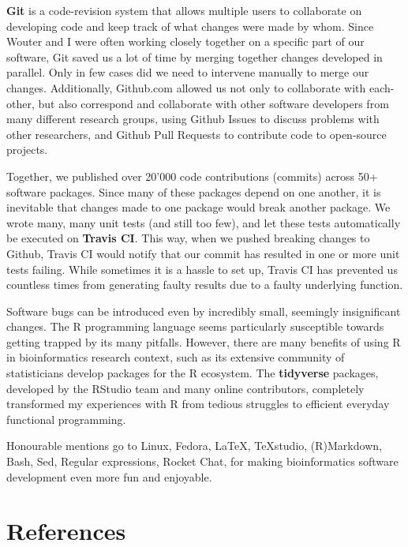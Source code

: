 \textbf{Git}\cite{torvalds_gitfastversion_2005} is a code-revision system that allows multiple users to collaborate on developing code and keep track of what changes were made by whom. 
Since Wouter and I were often working closely together on a specific part of our software, Git saved us a lot of time by merging together changes developed in parallel. Only in few cases did we need to intervene manually to merge our changes.
Additionally, Github.com allowed us not only to collaborate with each-other, but also correspond and collaborate with other software developers from many different research groups, using Github Issues to discuss problems with other researchers, and Github Pull Requests to contribute code to open-source projects. 

Together, we published over 20'000 code contributions (commits) across 50+ software packages\cite{cannoodt_developmentdynverse_2019}. Since many of these packages depend on one another, it is inevitable that changes made to one package would break another package. We wrote many, many unit tests (and still too few), and let these tests automatically be executed on \textbf{Travis CI}\cite{traviscigmbh_traviscitest_2011}. This way, when we pushed breaking changes to Github, Travis CI would notify that our commit has resulted in one or more unit tests failing. While sometimes it is a hassle to set up, Travis CI has prevented us countless times from generating faulty results due to a faulty underlying function.

Software bugs can be introduced even by incredibly small, seemingly insignificant changes. The R programming language seems particularly susceptible towards getting trapped by its many pitfalls. However, there are many benefits of using R in bioinformatics research context, such as its extensive community of statisticians develop packages for the R ecosystem. The \textbf{tidyverse} packages\cite{wickham_tidytoolsmanifesto_2017}, developed by the RStudio team and many online contributors, completely transformed my experiences with R from tedious struggles to efficient everyday functional programming.

Honourable mentions go to Linux, Fedora, \LaTeX, TeXstudio, (R)Markdown, Bash, Sed, Regular expressions, Rocket Chat, for making bioinformatics software development even more fun and enjoyable.




\clearpage
\section{References}
\printbibliography[heading=none]
